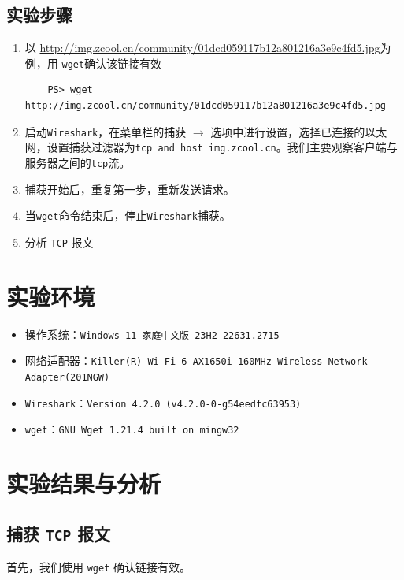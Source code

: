 \documentclass{article}
\begin{document}
\subsection{实验步骤}

\begin{enumerate}[noitemsep]
  \item 以 \url{http://img.zcool.cn/community/01dcd059117b12a801216a3e9c4fd5.jpg}为例，用 \texttt{wget}确认该链接有效
        \begin{lstlisting}
    PS> wget http://img.zcool.cn/community/01dcd059117b12a801216a3e9c4fd5.jpg
  \end{lstlisting}
  \item 启动\texttt{Wireshark}，在菜单栏的捕获 \( \to \) 选项中进行设置，选择已连接的以太网，设置捕获过滤器为\texttt{tcp and host img.zcool.cn}。我们主要观察客户端与服务器之间的\texttt{tcp}流。
  \item 捕获开始后，重复第一步，重新发送请求。
  \item 当\texttt{wget}命令结束后，停止\texttt{Wireshark}捕获。
  \item 分析 \texttt{TCP} 报文
\end{enumerate}

\section{实验环境}


\begin{itemize}[noitemsep]
  \item 操作系统：\texttt{Windows 11 家庭中文版 23H2 22631.2715}
  \item 网络适配器：\texttt{Killer(R) Wi-Fi 6 AX1650i 160MHz Wireless Network Adapter(201NGW)}
  \item \texttt{Wireshark}：\texttt{Version 4.2.0 (v4.2.0-0-g54eedfc63953)}
  \item \texttt{wget}：\texttt{GNU Wget 1.21.4 built on mingw32}
\end{itemize}


\section{实验结果与分析}

\subsection{捕获 \texttt{TCP} 报文}

首先，我们使用 \texttt{wget} 确认链接有效。
\end{document}
